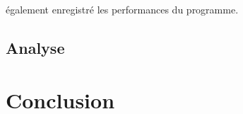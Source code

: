 		
		également enregistré les performances du
		programme.
		

		
		
	\section{Analyse}
\chapter{Conclusion}
